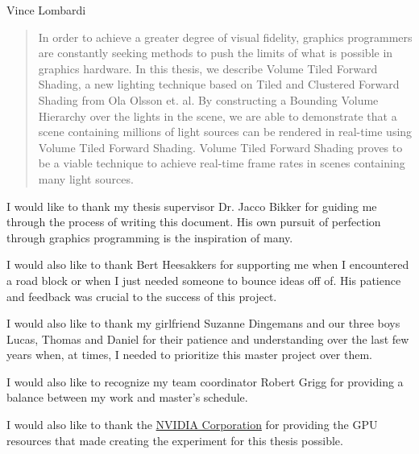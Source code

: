 \documentclass[
11pt, %
english, %
singlespacing, %
headsepline, %
]{MastersDoctoralThesis} %
\begin{document}
\hfill Vince Lombardi


\begin{abstract}
\addchaptertocentry{\abstractname} %

In order to achieve a greater degree of visual fidelity, graphics programmers are constantly seeking methods to push the limits of what is possible in graphics hardware. In this thesis, we describe Volume Tiled Forward Shading, a new lighting technique based on Tiled and Clustered Forward Shading from Ola Olsson et. al. By constructing a Bounding Volume Hierarchy over the lights in the scene, we are able to demonstrate that a scene containing millions of light sources can be rendered in real-time using Volume Tiled Forward Shading. Volume Tiled Forward Shading proves to be a viable technique to achieve real-time frame rates in scenes containing many light sources.

\end{abstract}


\begin{acknowledgements}
\addchaptertocentry{\acknowledgementname} %

I would like to thank my thesis supervisor Dr. Jacco Bikker for guiding me through the process of writing this document. His own pursuit of perfection through graphics programming is the inspiration of many.

I would also like to thank Bert Heesakkers for supporting me when I encountered a road block or when I just needed someone to bounce ideas off of. His patience and feedback was crucial to the success of this project.

I would also like to thank my girlfriend Suzanne Dingemans and our three boys Lucas, Thomas and Daniel for their patience and understanding over the last few years when, at times, I needed to prioritize this master project over them.

I would also like to recognize my team coordinator Robert Grigg for providing a balance between my work and master's schedule.

I would also like to thank the \href{http://www.nvidia.com/}{NVIDIA Corporation} for providing the GPU resources that made creating the experiment for this thesis possible.

\end{acknowledgements}
\end{document}
